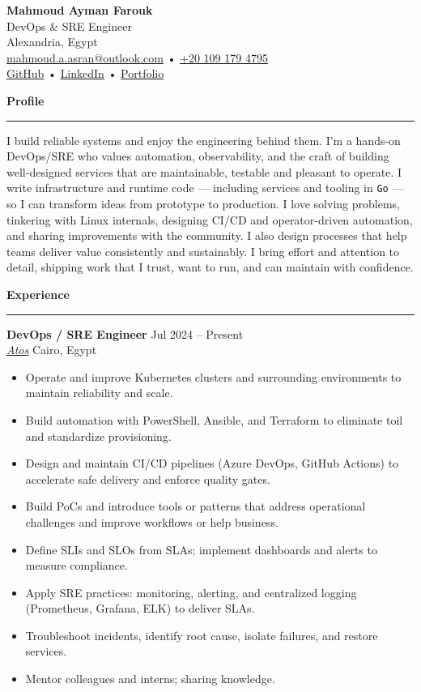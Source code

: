 \documentclass[11pt]{article}
\newcommand{\cvsection}[1]{%
  \vspace{6pt}%
  {\large\bfseries\textcolor{accent}{#1}}\\[-4pt]%
  \textcolor{accent}{\rule{\linewidth}{0.6pt}}%
  \vspace{6pt}%
}
\newcommand{\cventry}[5]{%
  {\textbf{#2}} \hfill {\small\textcolor{muted}{#1}}\\
  {\small\itshape #3} \hfill {\small\textcolor{muted}{#4}}\\[-6pt]
  #5
  \vspace{6pt}
}
\begin{document}
\begin{center}
	{\Huge\bfseries Mahmoud Ayman Farouk} \\[6pt]
	{\large\textcolor{accent}{DevOps \& SRE Engineer}} \\[8pt]
	Alexandria, Egypt \\[6pt]

	\href{mailto:mahmoud.a.asran@outlook.com}{mahmoud.a.asran@outlook.com} \quad • \quad
	\href{tel:+201091794795}{+20 109 179 4795} \\[6pt]

	\href{https://github.com/mahmoudk1000}{GitHub} \quad • \quad
	\href{https://www.linkedin.com/in/mahmoudk1000}{LinkedIn} \quad • \quad
	\href{https://mahmoudk1000.github.io/}{Portfolio}
\end{center}

\vspace{8pt}

\cvsection{Profile}
I build reliable systems and enjoy the engineering behind them. I’m a hands-on DevOps/SRE who values automation, observability, and the craft of building well-designed services that are maintainable, testable and pleasant to operate. I write infrastructure and runtime code — including services and tooling in \texttt{Go} — so I can transform ideas from prototype to production. I love solving problems, tinkering with Linux internals, designing CI/CD and operator-driven automation, and sharing improvements with the community. I also design processes that help teams deliver value consistently and sustainably. I bring effort and attention to detail, shipping work that I trust, want to run, and can maintain with confidence.

\cvsection{Experience}

\cventry{Jul 2024 -- Present}{DevOps / SRE Engineer}{\href{https://atos.net}{Atos}}{Cairo, Egypt}{%
	\begin{itemize}
		\item Operate and improve Kubernetes clusters and surrounding environments to maintain reliability and scale.
		\item Build automation with PowerShell, Ansible, and Terraform to eliminate toil and standardize provisioning.
		\item Design and maintain CI/CD pipelines (Azure DevOps, GitHub Actions) to accelerate safe delivery and enforce quality gates.
		\item Build PoCs and introduce tools or patterns that address operational challenges and improve workflows or help business.
		\item Define SLIs and SLOs from SLAs; implement dashboards and alerts to measure compliance.
		\item Apply SRE practices: monitoring, alerting, and centralized logging (Prometheus, Grafana, ELK) to deliver SLAs.
		\item Troubleshoot incidents, identify root cause, isolate failures, and restore services.
		\item Mentor colleagues and interns; sharing knowledge.
	\end{itemize}
}
\end{document}
